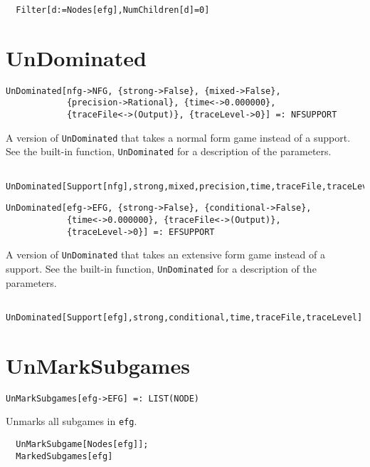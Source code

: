 \udfbody
\begin{verbatim}
  Filter[d:=Nodes[efg],NumChildren[d]=0]
\end{verbatim} 


\section*{UnDominated}\label{ExtUnDominated}
\begin{verbatim}
UnDominated[nfg->NFG, {strong->False}, {mixed->False}, 
            {precision->Rational}, {time<->0.000000}, 
            {traceFile<->(Output)}, {traceLevel->0}] =: NFSUPPORT 
\end{verbatim}

\noindent
A version of \verb+UnDominated+ that takes a normal form game instead
of a support.  See the built-in function, \verb+UnDominated+ for a
description of the parameters.

\udfbody
\begin{verbatim}
  UnDominated[Support[nfg],strong,mixed,precision,time,traceFile,traceLevel]
\end{verbatim} 

\newsignature

\begin{verbatim}
UnDominated[efg->EFG, {strong->False}, {conditional->False}, 
            {time<->0.000000}, {traceFile<->(Output)}, 
            {traceLevel->0}] =: EFSUPPORT 
\end{verbatim}

\noindent
A version of \verb+UnDominated+ that takes an extensive form game instead
of a support.  See the built-in function, \verb+UnDominated+ for a
description of the parameters.

\udfbody
\begin{verbatim}
  UnDominated[Support[efg],strong,conditional,time,traceFile,traceLevel]
\end{verbatim} 


\section*{UnMarkSubgames}\label{ExtUnMarkSubgames}
\begin{verbatim}
UnMarkSubgames[efg->EFG] =: LIST(NODE)
\end{verbatim}

\noindent
Unmarks all subgames in \verb+efg+.

\udfbody
\begin{verbatim}
  UnMarkSubgame[Nodes[efg]];
  MarkedSubgames[efg]
\end{verbatim} 






